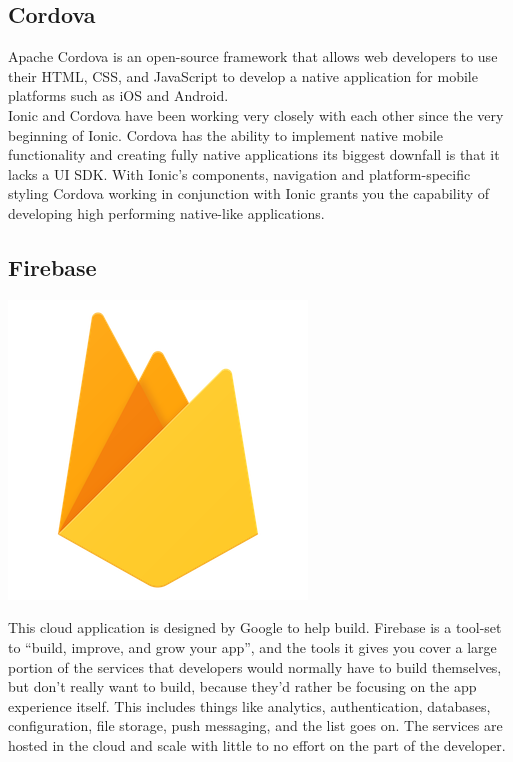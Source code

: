 \documentclass[a4paper,12pt]{report}
\begin{document}
\subsection{Cordova}
Apache Cordova is an open-source framework that allows web developers to use their HTML, CSS, and JavaScript to develop a native application for mobile platforms such as iOS and Android.\\

Ionic and Cordova have been working very closely with each other since the very beginning of Ionic. Cordova has the ability to implement native mobile functionality and creating fully native applications its biggest downfall is that it lacks a UI SDK.
With Ionic's components, navigation and platform-specific styling Cordova working in conjunction with Ionic grants you the capability of developing high performing native-like applications.\cite{cordovaInsight}

\subsection{Firebase} 
\includegraphics[scale=.05]{images/firebase.png}

This cloud application is designed by Google to help build. Firebase is a tool-set to “build, improve, and grow your app”, and the tools it gives you cover a large portion of the services that developers would normally have to build themselves, but don’t really want to build, because they’d rather be focusing on the app experience itself. This includes things like analytics, authentication, databases, configuration, file storage, push messaging, and the list goes on. The services are hosted in the cloud and scale with little to no effort on the part of the developer.
\end{document}
